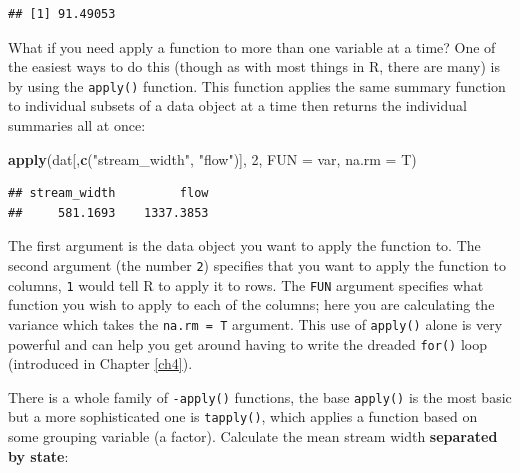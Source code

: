 \documentclass[]{book}
\newenvironment{Shaded}{\begin{snugshade}}{\end{snugshade}}
\newcommand{\KeywordTok}[1]{\textcolor[rgb]{0.13,0.29,0.53}{\textbf{#1}}}
\newcommand{\DataTypeTok}[1]{\textcolor[rgb]{0.13,0.29,0.53}{#1}}
\newcommand{\DecValTok}[1]{\textcolor[rgb]{0.00,0.00,0.81}{#1}}
\newcommand{\StringTok}[1]{\textcolor[rgb]{0.31,0.60,0.02}{#1}}
\newcommand{\OperatorTok}[1]{\textcolor[rgb]{0.81,0.36,0.00}{\textbf{#1}}}
\newcommand{\NormalTok}[1]{#1}
\theoremstyle{definition}
\theoremstyle{definition}
\theoremstyle{definition}
\theoremstyle{remark}
\begin{document}
\begin{Shaded}
\end{Shaded}

\begin{verbatim}
## [1] 91.49053
\end{verbatim}

What if you need apply a function to more than one variable at a time?
One of the easiest ways to do this (though as with most things in R,
there are many) is by using the \texttt{apply()} function. This function
applies the same summary function to individual subsets of a data object
at a time then returns the individual summaries all at once:

\begin{Shaded}
\begin{Highlighting}[]
\KeywordTok{apply}\NormalTok{(dat[,}\KeywordTok{c}\NormalTok{(}\StringTok{"stream_width"}\NormalTok{, }\StringTok{"flow"}\NormalTok{)], }\DecValTok{2}\NormalTok{, }\DataTypeTok{FUN =}\NormalTok{ var, }\DataTypeTok{na.rm =}\NormalTok{ T)}
\end{Highlighting}
\end{Shaded}

\begin{verbatim}
## stream_width         flow 
##     581.1693    1337.3853
\end{verbatim}

The first argument is the data object you want to apply the function to.
The second argument (the number \texttt{2}) specifies that you want to
apply the function to columns, \texttt{1} would tell R to apply it to
rows. The \texttt{FUN} argument specifies what function you wish to
apply to each of the columns; here you are calculating the variance
which takes the \texttt{na.rm\ =\ T} argument. This use of
\texttt{apply()} alone is very powerful and can help you get around
having to write the dreaded \texttt{for()} loop (introduced in Chapter
\ref{ch4}).

There is a whole family of \texttt{-apply()} functions, the base
\texttt{apply()} is the most basic but a more sophisticated one is
\texttt{tapply()}, which applies a function based on some grouping
variable (a factor). Calculate the mean stream width \textbf{separated
by state}:
\end{document}
